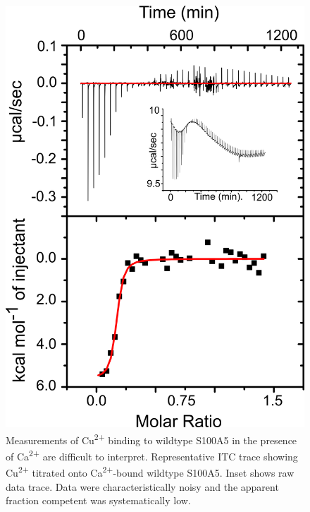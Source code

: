 \begin{figure}
\centering
	\includegraphics{ch4-fig1.png} 
\caption[Measurements of Cu\textsuperscript{2+} binding to
wildtype S100A5 in the presence\newline of Ca\textsuperscript{2+} are difficult
to interpret]{Measurements of Cu\textsuperscript{2+} binding to
wildtype S100A5 in the presence of Ca\textsuperscript{2+} are difficult
to interpret. Representative ITC trace showing Cu\textsuperscript{2+} 
titrated onto Ca\textsuperscript{2+}-bound wildtype S100A5. Inset
shows raw data trace. Data were characteristically noisy and the apparent
fraction competent was systematically low.\label{samplefigure}}	
\end{figure}


